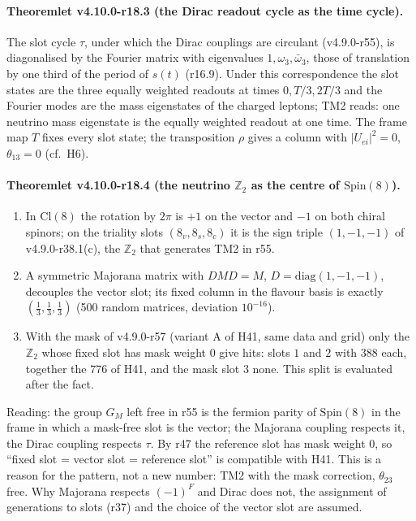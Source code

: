 \paragraph{Theoremlet v4.10.0-r18.3 (the Dirac readout cycle as the time cycle).}
The slot cycle \(\tau\), under which the Dirac couplings are circulant (v4.9.0-r55), is diagonalised by the Fourier matrix with eigenvalues
\(1,\omega_3,\bar\omega_3\), those of translation by one third of the period of \(s(t)\) (r16.9).  Under this correspondence the slot states are
the three equally weighted readouts at times \(0,T/3,2T/3\) and the Fourier modes are the mass eigenstates of the charged leptons; TM2
reads: one neutrino mass eigenstate is the equally weighted readout at one time.  The frame map \(T\) fixes every slot state; the
transposition \(\rho\) gives a column with \(|U_{e i}|^2=0\), \(\theta_{13}=0\) (cf.\ H6).

\paragraph{Theoremlet v4.10.0-r18.4 (the neutrino \(\mathbb Z_2\) as the centre of \(\mathrm{Spin}(8)\)).}
\begin{enumerate}[leftmargin=2em]
\item[(a)] In \(\mathrm{Cl}(8)\) the rotation by \(2\pi\) is \(+1\) on the vector and \(-1\) on both chiral spinors; on the triality slots
\((8_v,8_s,8_c)\) it is the sign triple \((1,-1,-1)\) of v4.9.0-r38.1(c), the \(\mathbb Z_2\) that generates TM2 in r55.
\item[(b)] A symmetric Majorana matrix with \(DMD=M\), \(D=\mathrm{diag}(1,-1,-1)\), decouples the vector slot; its fixed column in the flavour
basis is exactly \((\tfrac13,\tfrac13,\tfrac13)\) (500 random matrices, deviation \(10^{-16}\)).
\item[(c)] With the mask of v4.9.0-r57 (variant A of H41, same data and grid) only the \(\mathbb Z_2\) whose fixed slot has mask weight \(0\) give hits:
slots \(1\) and \(2\) with \(388\) each, together the \(776\) of H41, and the mask slot \(3\) none.  This split is evaluated after the fact.
\end{enumerate}
Reading: the group \(G_M\) left free in r55 is the fermion parity of \(\mathrm{Spin}(8)\) in the frame in which a mask-free slot is the vector;
the Majorana coupling respects it, the Dirac coupling respects \(\tau\).  By r47 the reference slot has mask weight \(0\), so ``fixed slot =
vector slot = reference slot'' is compatible with H41.  This is a reason for the pattern, not a new number: TM2 with the mask correction,
\(\theta_{23}\) free.  Why Majorana respects \((-1)^F\) and Dirac does not, the assignment of generations to slots (r37) and the choice of the
vector slot are assumed.

